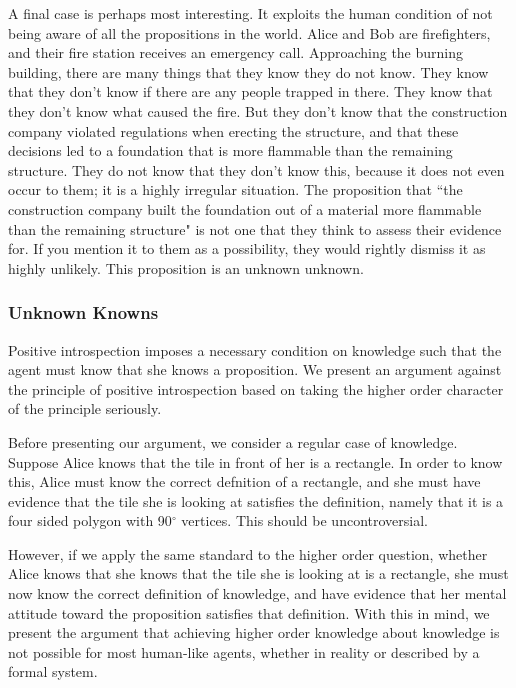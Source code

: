 A final case is perhaps most interesting. It exploits the human condition of not being aware of all the propositions in the world. Alice and Bob are firefighters, and their fire station receives an emergency call. Approaching the burning building, there are many things that they know they do not know. They know that they don't know if there are any people trapped in there. They know that they don't know what caused the fire. But they don't know that the construction company violated regulations when erecting the structure, and that these decisions led to a foundation that is more flammable than the remaining structure. They do not know that they don't know this, because it does not even occur to them; it is a highly irregular situation. The proposition that ``the construction company built the foundation out of a material more flammable than the remaining structure" is not one that they think to assess their evidence for. If you mention it to them as a possibility, they would rightly dismiss it as highly unlikely. This proposition is an unknown unknown.

\subsubsection{Unknown Knowns}

Positive introspection imposes a necessary condition on knowledge such that the agent must know that she knows a proposition. We present an argument against the principle of positive introspection based on taking the higher order character of the principle seriously.

Before presenting our argument, we consider a regular case of knowledge. Suppose Alice knows that the tile in front of her is a rectangle. In order to know this, Alice must know the correct defnition of a rectangle, and she must have evidence that the tile she is looking at satisfies the definition, namely that it is a four sided polygon with 90$^\circ$ vertices. This should be uncontroversial.

However, if we apply the same standard to the higher order question, whether Alice knows that she knows that the tile she is looking at is a rectangle, she must now know the correct definition of knowledge, and have evidence that her mental attitude toward the proposition satisfies that definition. With this in mind, we present the argument that achieving higher order knowledge about knowledge is not possible for most human-like agents, whether in reality or described by a formal system.

